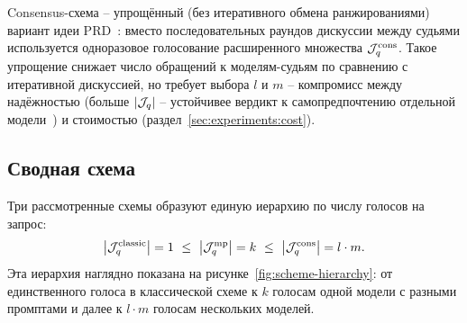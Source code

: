 Consensus-схема -- упрощённый (без итеративного обмена ранжированиями)
вариант идеи PRD~\cite{li2023prd}: вместо последовательных раундов
дискуссии между судьями используется одноразовое голосование расширенного
множества $\mathcal{J}_q^{\mathrm{cons}}$.
Такое упрощение снижает число обращений к моделям-судьям по сравнению с
итеративной дискуссией, но требует выбора $l$ и $m$ -- компромисс между
надёжностью (больше $\left\lvert\mathcal{J}_q\right\rvert$ -- устойчивее вердикт к
самопредпочтению отдельной модели~\cite{wataoka2024selfpreference}) и
стоимостью (раздел~\ref{sec:experiments:cost}).

\subsection{Сводная схема}

Три рассмотренные схемы образуют единую иерархию по числу голосов на
запрос:
\begin{equation}
    \label{eq:hierarchy}
    \left\lvert\mathcal{J}_q^{\mathrm{classic}}\right\rvert = 1
    \ \le\
    \left\lvert\mathcal{J}_q^{\mathrm{mp}}\right\rvert = k
    \ \le\
    \left\lvert\mathcal{J}_q^{\mathrm{cons}}\right\rvert = l \cdot m.
\end{equation}
Эта иерархия наглядно показана на рисунке~\ref{fig:scheme-hierarchy}:
от единственного голоса в классической схеме к $k$ голосам одной модели
с разными промптами и далее к $l \cdot m$ голосам нескольких моделей.

